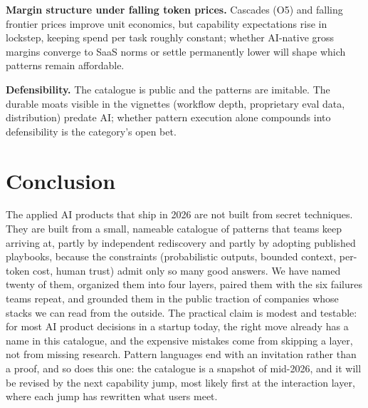 \documentclass[11pt]{article}
\begin{document}
\textbf{Margin structure under falling token prices.} Cascades (O5) and
falling frontier prices improve unit economics, but capability expectations
rise in lockstep, keeping spend per task roughly constant; whether AI-native
gross margins converge to SaaS norms or settle permanently lower
\citep{bvp2026pricing} will shape which patterns remain affordable.

\textbf{Defensibility.} The catalogue is public and the patterns are
imitable. The durable moats visible in the vignettes (workflow depth,
proprietary eval data, distribution) predate AI; whether pattern execution
alone compounds into defensibility is the category's open bet.

\section{Conclusion}

The applied AI products that ship in 2026 are not built from secret
techniques. They are built from a small, nameable catalogue of patterns that
teams keep arriving at, partly by independent rediscovery and partly by
adopting published playbooks, because the constraints (probabilistic outputs,
bounded context, per-token cost, human trust) admit only so many good
answers. We have named twenty of them, organized them into four layers, paired
them with the six failures teams repeat, and grounded them in the public
traction of companies whose stacks we can read from the outside. The practical
claim is modest and testable: for most AI product decisions in a startup
today, the right move already has a name in this catalogue, and the expensive
mistakes come from skipping a layer, not from missing research. Pattern
languages end with an invitation rather than a proof, and so does this one:
the catalogue is a snapshot of mid-2026, and it will be revised by the next
capability jump, most likely first at the interaction layer, where each jump
has rewritten what users meet.

\begingroup
\raggedright


\endgroup
\end{document}
